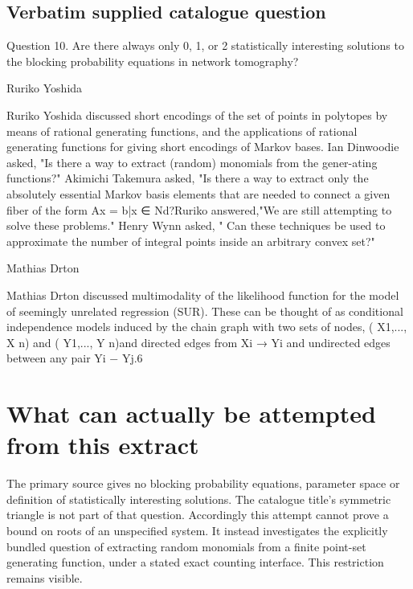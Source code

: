 \documentclass[11pt]{article}
\begin{document}
\subsection{Verbatim supplied catalogue question}
Question 10. Are there always only 0, 1, or 2 statistically interesting solutions to the blocking probability equations in network tomography?

Ruriko Yoshida

Ruriko Yoshida discussed short encodings of the set of points in polytopes by means of rational generating functions, and the applications of rational generating functions for giving short encodings of Markov bases. Ian Dinwoodie asked, "Is there a way to extract (random) monomials from the gener-ating functions?" Akimichi Takemura asked, "Is there a way to extract only the absolutely essential Markov basis elements that are needed to connect a given fiber of the form {Ax = b|x ∈ Nd}?Ruriko answered,"We are still attempting to solve these problems." Henry Wynn asked, " Can these techniques be used to approximate the number of integral points inside an arbitrary convex set?"

Mathias Drton

Mathias Drton discussed multimodality of the likelihood function for the model of seemingly unrelated regression (SUR). These can be thought of as conditional independence models induced by the chain graph with two sets of nodes, ( X1,..., X n) and ( Y1,..., Y n)and directed edges from Xi → Yi and undirected edges between any pair Yi − Yj.6

\section{What can actually be attempted from this extract}
The primary source gives no blocking probability equations, parameter
space or definition of statistically interesting solutions. The
catalogue title's symmetric triangle is not part of that question.
Accordingly this attempt cannot prove a bound on roots of an unspecified
system. It instead investigates the explicitly bundled question of
extracting random monomials from a finite point-set generating function,
under a stated exact counting interface. This restriction remains visible.
\end{document}
